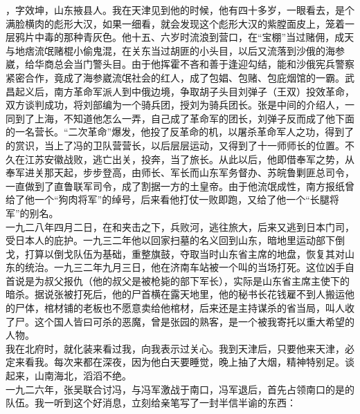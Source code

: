 ，字效坤，山东掖县人。我在天津见到他的时候，他有四十多岁，一眼看去，是个满脸横肉的彪形大汉，如果一细看，就会发现这个彪形大汉的紫膛面皮上，笼着一层鸦片中毒的那种青灰色。他十五、六岁时流浪到营口，在“宝棚”当过赌佣，成天与地痞流氓赌棍小偷鬼混，在关东当过胡匪的小头目，以后又流落到沙俄的海参崴，给华商总会当门警头目。由于他挥霍不吝和善于逢迎勾结，能和沙俄宪兵警察紧密合作，竟成了海参崴流氓社会的红人，成了包娼、包赌、包庇烟馆的一霸。武昌起义后，南方革命军派人到中俄边境，争取胡子头目刘弹子（王双）投效革命，双方谈判成功，将刘部编为一个骑兵团，授刘为骑兵团长。张是中间的介绍人，一同到了上海，不知道他怎么一弄，自己成了革命军的团长，刘弹子反而成了他下面的一名营长。“二次革命”爆发，他投了反革命的机，以屠杀革命军人之功，得到了的赏识，当上了冯的卫队营营长，以后层层运动，又得到了十一师师长的位置。不久在江苏安徽战败，逃亡出关，投奔，当了旅长。从此以后，他即借奉军之势，从奉军进关那天起，步步登高，由师长、军长而山东军务督办、苏皖鲁剿匪总司令，一直做到了直鲁联军司令，成了割据一方的土皇帝。由于他流氓成性，南方报纸曾给了他一个“狗肉将军”的绰号，后来看他打仗一败即跑，又给了他一个“长腿将军”的别名。\\

一九二八年四月二日，在和夹击之下，兵败河，逃往旅大，后来又逃到日本门司，受日本人的庇护。一九三二年他以回家扫墓的名义回到山东，暗地里运动部下倒戈，打算以倒戈队伍为基础，重整旗鼓，夺取当时山东省主席的地盘，恢复其对山东的统治。一九三二年九月三日，他在济南车站被一个叫的当场打死。这位凶手自首说是为叔父报仇（他的叔父是被枪毙的部下军长），实际是山东省主席主使下的暗杀。据说张被打死后，他的尸首横在露天地里，他的秘书长花钱雇不到人搬运他的尸体，棺材铺的老板也不愿意卖给他棺材，后来还是主持谋杀的省当局，叫人收了尸。这个国人皆曰可杀的恶魔，曾是张园的熟客，是一个被我寄托以重大希望的人物。\\

我在北府时，就化装来看过我，向我表示过关心。我到天津后，只要他来天津，必定来看我。每次来都在深夜，因为他白天要睡觉，晚上抽了大烟，精神特别足。谈起来，山南海北，滔滔不绝。\\

一九二六年，张吴联合讨冯，与冯军激战于南口，冯军退后，首先占领南口的是的队伍。我一听到这个好消息，立刻给亲笔写了一封半信半谕的东西：\\

